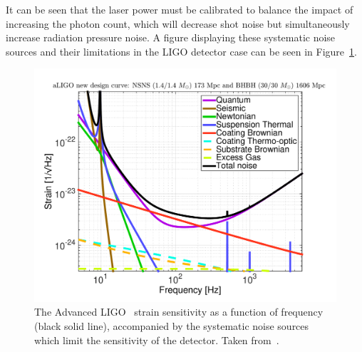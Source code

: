 It can be seen that the laser power must be calibrated to balance the impact of increasing the photon count, which will decrease shot noise but simultaneously increase radiation pressure noise. A figure displaying these systematic noise sources and their limitations in the LIGO detector case can be seen in Figure~\ref{3:fig:aLIGO_noise}.
%
\begin{figure}
    \centering
    \includegraphics[width=0.75\linewidth]{images/3_detector_characterisation/aLIGO_newDesign.pdf}
    \caption{The Advanced LIGO~\cite{aLIGO:2015} strain sensitivity as a function of frequency (black solid line), accompanied by the systematic noise sources which limit the sensitivity of the detector. Taken from~\cite{aLIGO_design_curve:2018}.}
    \label{3:fig:aLIGO_noise}
\end{figure}
%

